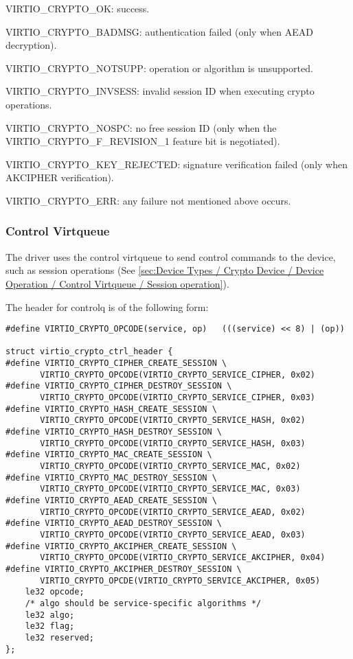 \begin{itemize*}
\item VIRTIO_CRYPTO_OK: success.
\item VIRTIO_CRYPTO_BADMSG: authentication failed (only when AEAD decryption).
\item VIRTIO_CRYPTO_NOTSUPP: operation or algorithm is unsupported.
\item VIRTIO_CRYPTO_INVSESS: invalid session ID when executing crypto operations.
\item VIRTIO_CRYPTO_NOSPC: no free session ID (only when the VIRTIO_CRYPTO_F_REVISION_1
    feature bit is negotiated).
\item VIRTIO_CRYPTO_KEY_REJECTED: signature verification failed (only when AKCIPHER verification).
\item VIRTIO_CRYPTO_ERR: any failure not mentioned above occurs.
\end{itemize*}

\subsubsection{Control Virtqueue}\label{sec:Device Types / Crypto Device / Device Operation / Control Virtqueue}

The driver uses the control virtqueue to send control commands to the
device, such as session operations (See \ref{sec:Device Types / Crypto Device / Device
Operation / Control Virtqueue / Session operation}).

The header for controlq is of the following form:
\begin{lstlisting}
#define VIRTIO_CRYPTO_OPCODE(service, op)   (((service) << 8) | (op))

struct virtio_crypto_ctrl_header {
#define VIRTIO_CRYPTO_CIPHER_CREATE_SESSION \
       VIRTIO_CRYPTO_OPCODE(VIRTIO_CRYPTO_SERVICE_CIPHER, 0x02)
#define VIRTIO_CRYPTO_CIPHER_DESTROY_SESSION \
       VIRTIO_CRYPTO_OPCODE(VIRTIO_CRYPTO_SERVICE_CIPHER, 0x03)
#define VIRTIO_CRYPTO_HASH_CREATE_SESSION \
       VIRTIO_CRYPTO_OPCODE(VIRTIO_CRYPTO_SERVICE_HASH, 0x02)
#define VIRTIO_CRYPTO_HASH_DESTROY_SESSION \
       VIRTIO_CRYPTO_OPCODE(VIRTIO_CRYPTO_SERVICE_HASH, 0x03)
#define VIRTIO_CRYPTO_MAC_CREATE_SESSION \
       VIRTIO_CRYPTO_OPCODE(VIRTIO_CRYPTO_SERVICE_MAC, 0x02)
#define VIRTIO_CRYPTO_MAC_DESTROY_SESSION \
       VIRTIO_CRYPTO_OPCODE(VIRTIO_CRYPTO_SERVICE_MAC, 0x03)
#define VIRTIO_CRYPTO_AEAD_CREATE_SESSION \
       VIRTIO_CRYPTO_OPCODE(VIRTIO_CRYPTO_SERVICE_AEAD, 0x02)
#define VIRTIO_CRYPTO_AEAD_DESTROY_SESSION \
       VIRTIO_CRYPTO_OPCODE(VIRTIO_CRYPTO_SERVICE_AEAD, 0x03)
#define VIRTIO_CRYPTO_AKCIPHER_CREATE_SESSION \
       VIRTIO_CRYPTO_OPCODE(VIRTIO_CRYPTO_SERVICE_AKCIPHER, 0x04)
#define VIRTIO_CRYPTO_AKCIPHER_DESTROY_SESSION \
       VIRTIO_CRYPTO_OPCDE(VIRTIO_CRYPTO_SERVICE_AKCIPHER, 0x05)
    le32 opcode;
    /* algo should be service-specific algorithms */
    le32 algo;
    le32 flag;
    le32 reserved;
};
\end{lstlisting}


